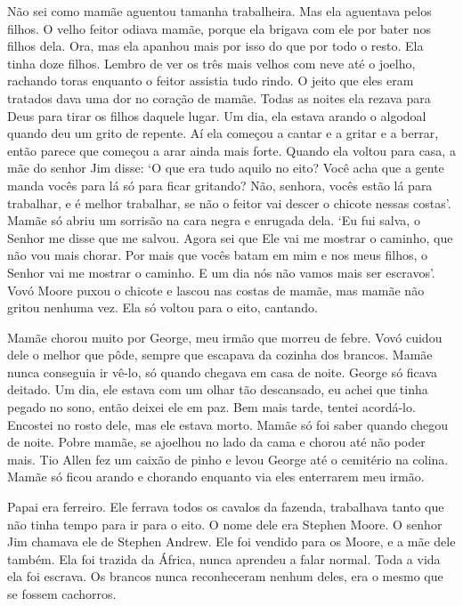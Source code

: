 Não sei como mamãe aguentou tamanha trabalheira. Mas ela aguentava pelos
filhos. O velho feitor odiava mamãe, porque ela brigava com ele por
bater nos filhos dela. Ora, mas ela apanhou mais por isso do que por
todo o resto. Ela tinha doze filhos. Lembro de ver os três mais velhos
com neve até o joelho, rachando toras enquanto o feitor assistia tudo
rindo. O jeito que eles eram tratados dava uma dor no coração de mamãe.
Todas as noites ela rezava para Deus para tirar os filhos daquele lugar.
Um dia, ela estava arando o algodoal quando deu um grito de repente. Aí
ela começou a cantar e a gritar e a berrar, então parece que começou a
arar ainda mais forte. Quando ela voltou para casa, a mãe do senhor Jim
disse: `O que era tudo aquilo no eito? Você acha que a gente manda vocês
para lá só para ficar gritando? Não, senhora, vocês estão lá para
trabalhar, e é melhor trabalhar, se não o feitor vai descer o chicote
nessas costas'. Mamãe só abriu um sorrisão na cara negra e enrugada
dela. `Eu fui salva, o Senhor me disse que me salvou. Agora sei que Ele
vai me mostrar o caminho, que não vou mais chorar. Por mais que vocês
batam em mim e nos meus filhos, o Senhor vai me mostrar o caminho. E um
dia nós não vamos mais ser escravos'. Vovó Moore puxou o chicote e
lascou nas costas de mamãe, mas mamãe não gritou nenhuma vez. Ela só
voltou para o eito, cantando.

Mamãe chorou muito por George, meu irmão que morreu de febre. Vovó
cuidou dele o melhor que pôde, sempre que escapava da cozinha dos
brancos. Mamãe nunca conseguia ir vê-lo, só quando chegava em casa de
noite. George só ficava deitado. Um dia, ele estava com um olhar tão
descansado, eu achei que tinha pegado no sono, então deixei ele em paz.
Bem mais tarde, tentei acordá-lo. Encostei no rosto dele, mas ele estava
morto. Mamãe só foi saber quando chegou de noite. Pobre mamãe, se
ajoelhou no lado da cama e chorou até não poder mais. Tio Allen fez um
caixão de pinho e levou George até o cemitério na colina. Mamãe só ficou
arando e chorando enquanto via eles enterrarem meu irmão.

Papai era ferreiro. Ele ferrava todos os cavalos da fazenda, trabalhava
tanto que não tinha tempo para ir para o eito. O nome dele era Stephen
Moore. O senhor Jim chamava ele de Stephen Andrew. Ele foi vendido para
os Moore, e a mãe dele também. Ela foi trazida da África, nunca aprendeu
a falar normal. Toda a vida ela foi escrava. Os brancos nunca
reconheceram nenhum deles, era o mesmo que se fossem cachorros.

